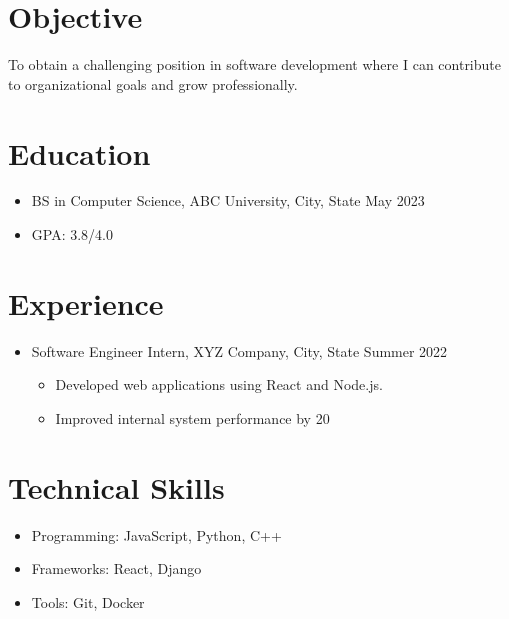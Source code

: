 \documentclass{res}
\begin{document}
    \section{Objective}
    To obtain a challenging position in software development where I can contribute to organizational goals and grow professionally.

    \section{Education}
    \begin{itemize}
        \item BS in Computer Science, ABC University, City, State \hfill May 2023
        \item GPA: 3.8/4.0
    \end{itemize}

    \section{Experience}
    \begin{itemize}
        \item Software Engineer Intern, XYZ Company, City, State \hfill Summer 2022
        \begin{itemize}
            \item Developed web applications using React and Node.js.
            \item Improved internal system performance by 20%
        \end{itemize}
    \end{itemize}

    \section{Technical Skills}
    \begin{itemize}
        \item Programming: JavaScript, Python, C++
        \item Frameworks: React, Django
        \item Tools: Git, Docker
    \end{itemize}
\end{document}
